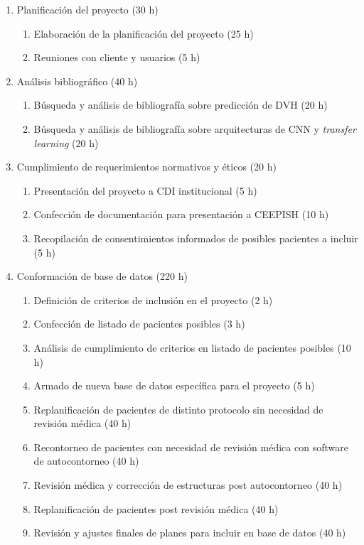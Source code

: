 \documentclass[
11pt, %
codirector, %
]{charter}
\begin{document}
\begin{enumerate}
\item Planificación del proyecto (30 h)
	\begin{enumerate}
	\item Elaboración de la planificación del proyecto (25 h)
	\item Reuniones con cliente y usuarios (5 h)
	\end{enumerate}
\item Análisis bibliográfico (40 h)
	\begin{enumerate}
	\item Búsqueda y análisis de bibliografía sobre predicción de DVH (20 h)
	\item Búsqueda y análisis de bibliografía sobre arquitecturas de CNN y \textit{transfer learning} (20 h)
	\end{enumerate}
\item Cumplimiento de requerimientos normativos y éticos (20 h)
	\begin{enumerate}
	\item Presentación del proyecto a CDI institucional (5 h)
	\item Confección de documentación para presentación a CEEPISH (10 h)
	\item Recopilación de consentimientos informados de posibles pacientes a incluir (5 h)
	\end{enumerate}
\item Conformación de base de datos (220 h)
	\begin{enumerate}
	\item Definición de criterios de inclusión en el proyecto (2 h)
	\item Confección de listado de pacientes posibles (3 h)
	\item Análisis de cumplimiento de criterios en listado de pacientes posibles (10 h)
	\item Armado de nueva base de datos específica para el proyecto (5 h)
	\item Replanificación de pacientes de distinto protocolo sin necesidad de revisión médica (40 h)
	\item Recontorneo de pacientes con necesidad de revisión médica con software de autocontorneo (40 h)
	\item Revisión médica y corrección de estructuras post autocontorneo (40 h)
	\item Replanificación de pacientes post revisión médica (40 h)
	\item Revisión y ajustes finales de planes para incluir en base de datos (40 h)

\end{enumerate}
\end{enumerate}
\end{document}
